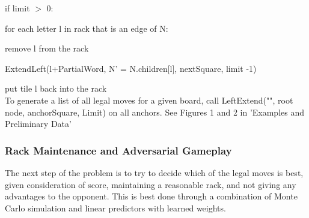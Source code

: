 \documentclass[12pt]{article}
\begin{document}
\quad\quad if limit $>$ 0: 

\quad\quad\quad for each letter l in rack that is an edge of N: 

\quad\quad\quad\quad remove l from the rack

\quad\quad\quad\quad ExtendLeft(l+PartialWord, N' =
N.children[l], nextSquare, limit -1)

\quad\quad\quad\quad put tile l back into the rack\\
			
To generate a list of all legal moves for a given board, call
LeftExtend("", root node, anchorSquare, Limit) on all anchors. See
Figures 1 and 2 in 'Examples and Preliminary Data'




\subsubsection*{Rack Maintenance and Adversarial Gameplay}
The next step of the problem is to try to decide which of the legal
moves is best, given consideration of score, maintaining a reasonable
rack, and not giving any advantages to the opponent. This is best done
through a combination of Monte Carlo simulation and linear predictors
with learned weights.
\end{document}
